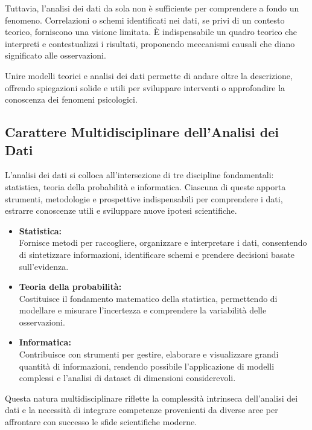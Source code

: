 \documentclass[
  letterpaper,
]{krantz}
\begin{document}
Tuttavia, l'analisi dei dati da sola non è sufficiente per comprendere a
fondo un fenomeno. Correlazioni o schemi identificati nei dati, se privi
di un contesto teorico, forniscono una visione limitata. È
indispensabile un quadro teorico che interpreti e contestualizzi i
risultati, proponendo meccanismi causali che diano significato alle
osservazioni.

Unire modelli teorici e analisi dei dati permette di andare oltre la
descrizione, offrendo spiegazioni solide e utili per sviluppare
interventi o approfondire la conoscenza dei fenomeni psicologici.

\subsection{Carattere Multidisciplinare dell'Analisi dei
Dati}\label{carattere-multidisciplinare-dellanalisi-dei-dati}

L'analisi dei dati si colloca all'intersezione di tre discipline
fondamentali: statistica, teoria della probabilità e informatica.
Ciascuna di queste apporta strumenti, metodologie e prospettive
indispensabili per comprendere i dati, estrarre conoscenze utili e
sviluppare nuove ipotesi scientifiche.

\begin{itemize}
\item
  \textbf{Statistica:}\\
  Fornisce metodi per raccogliere, organizzare e interpretare i dati,
  consentendo di sintetizzare informazioni, identificare schemi e
  prendere decisioni basate sull'evidenza.
\item
  \textbf{Teoria della probabilità:}\\
  Costituisce il fondamento matematico della statistica, permettendo di
  modellare e misurare l'incertezza e comprendere la variabilità delle
  osservazioni.
\item
  \textbf{Informatica:}\\
  Contribuisce con strumenti per gestire, elaborare e visualizzare
  grandi quantità di informazioni, rendendo possibile l'applicazione di
  modelli complessi e l'analisi di dataset di dimensioni considerevoli.
\end{itemize}

Questa natura multidisciplinare riflette la complessità intrinseca
dell'analisi dei dati e la necessità di integrare competenze provenienti
da diverse aree per affrontare con successo le sfide scientifiche
moderne.
\end{document}
